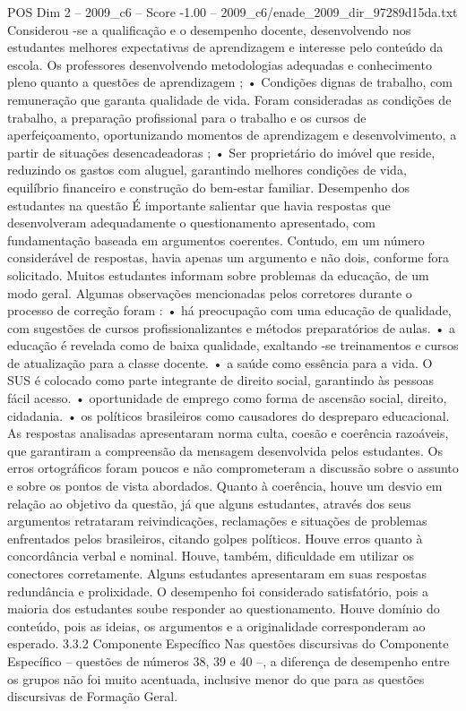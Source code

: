 \begin{textsample}{POS Dim 2 – 2009\_c6 – Score -1.00 – 2009\_c6/enade\_2009\_dir\_97289d15da.txt}
Considerou -se a qualificação e o desempenho docente, desenvolvendo nos estudantes melhores expectativas de aprendizagem e interesse pelo conteúdo da escola.
Os professores desenvolvendo metodologias adequadas e conhecimento pleno quanto a questões de aprendizagem ; • Condições dignas de trabalho, com remuneração que garanta qualidade de vida.
Foram consideradas as condições de trabalho, a preparação profissional para o trabalho e os cursos de aperfeiçoamento, oportunizando momentos de aprendizagem e desenvolvimento, a partir de situações desencadeadoras ; • Ser proprietário do imóvel que reside, reduzindo os gastos com aluguel, garantindo melhores condições de vida, equilíbrio financeiro e construção do bem-estar familiar.
Desempenho dos estudantes na questão É importante salientar que havia respostas que desenvolveram adequadamente o questionamento apresentado, com fundamentação baseada em argumentos coerentes.
Contudo, em um número considerável de respostas, havia apenas um argumento e não dois, conforme fora solicitado.
Muitos estudantes informam sobre problemas da educação, de um modo geral.
Algumas observações mencionadas pelos corretores durante o processo de correção foram : • há preocupação com uma educação de qualidade, com sugestões de cursos profissionalizantes e métodos preparatórios de aulas. • a educação é revelada como de baixa qualidade, exaltando -se treinamentos e cursos de atualização para a classe docente. • a saúde como essência para a vida.
O SUS é colocado como parte integrante de direito social, garantindo às pessoas fácil acesso. • oportunidade de emprego como forma de ascensão social, direito, cidadania. • os políticos brasileiros como causadores do despreparo educacional.
As respostas analisadas apresentaram norma culta, coesão e coerência razoáveis, que garantiram a compreensão da mensagem desenvolvida pelos estudantes.
Os erros ortográficos foram poucos e não comprometeram a discussão sobre o assunto e sobre os pontos de vista abordados.
Quanto à coerência, houve um desvio em relação ao objetivo da questão, já que alguns estudantes, através dos seus argumentos retrataram reivindicações, reclamações e situações de problemas enfrentados pelos brasileiros, citando golpes políticos.
Houve erros quanto à concordância verbal e nominal.
Houve, também, dificuldade em utilizar os conectores corretamente.
Alguns estudantes apresentaram em suas respostas redundância e prolixidade.
O desempenho foi considerado satisfatório, pois a maioria dos estudantes soube responder ao questionamento.
Houve domínio do conteúdo, pois as ideias, os argumentos e a originalidade corresponderam ao esperado. 3.3.2 Componente Específico Nas questões discursivas do Componente Específico – questões de números 38, 39 e 40 –, a diferença de desempenho entre os grupos não foi muito acentuada, inclusive menor do que para as questões discursivas de Formação Geral.

\end{textsample}
